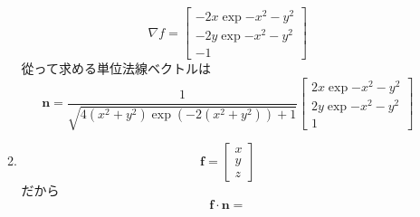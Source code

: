 \documentclass[a4paper,10pt,report]{amsart}
\theoremstyle{plain}
\theoremstyle{definition}
\theoremstyle{remark}
\begin{document}
\begin{enumerate}
\begin{enumerate}
\begin{equation*}
                \nabla f=\begin{bmatrix}
                    -2x\exp{-x^{2}-y^{2}}\\
                    -2y\exp{-x^{2}-y^{2}}\\
                    -1
                \end{bmatrix}
            \end{equation*}
            從って求める単位法線ベクトルは
            \begin{equation*}
                \bm{n}=\frac{1}{\sqrt{4(x^{2}+y^{2})\exp{(-2(x^{2}+y^{2}))}+1}}\begin{bmatrix}
                    2x\exp{-x^{2}-y^{2}}\\
                    2y\exp{-x^{2}-y^{2}}\\
                    1
                \end{bmatrix}
            \end{equation*}
            \item 
            \begin{equation*}
                \bm{f}=\begin{bmatrix}
                    x\\
                    y\\
                    z
                \end{bmatrix}
            \end{equation*}
            だから
            \begin{equation*}
                \bm{f}\cdot\bm{n}=
            \end{equation*}
        \end{enumerate}
    \end{enumerate}
\end{document}
